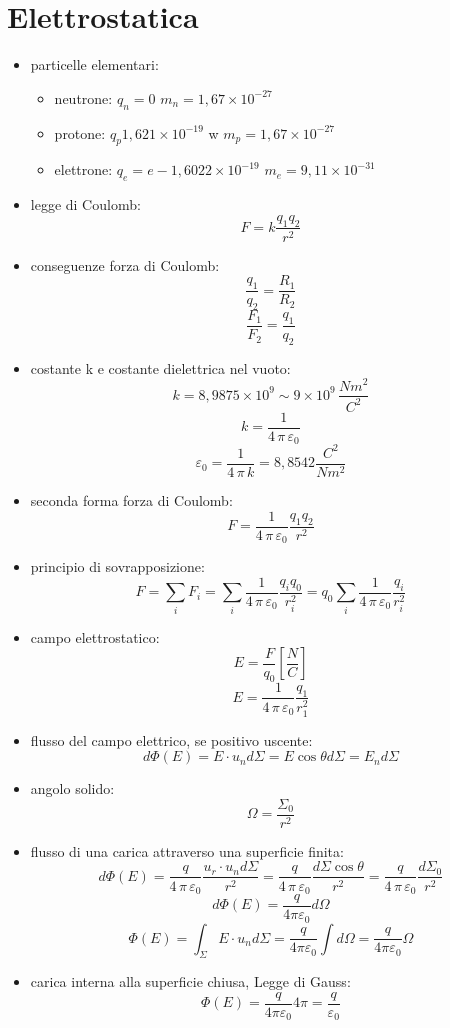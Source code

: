 \documentclass[a4paper,12pt, oneside]{book}
\begin{document}
\section{Elettrostatica}
\begin{itemize}
\item particelle elementari:
\begin{itemize}
\item neutrone: $q_n=0$ $m_n=1,67\times 10^{-27}$
\item protone: $q_p1,621\times 10^{-19}$ w $m_p=1,67\times 10^{-27}$
\item elettrone: $q_e=e-1,6022\times 10^{-19}$ $m_e=9,11\times 10^{-31}$ 
\end{itemize}
\item legge di Coulomb:
$$F=k\frac{q_1q_2}{r^2}$$
\item conseguenze forza di Coulomb:
$$\frac{q_1}{q_2}=\frac{R_1}{R_2}$$
$$\frac{F_1}{F_2}=\frac{q_1}{q_2}$$
\item costante k e costante dielettrica nel vuoto:
$$k=8,9875\times 10^9\sim 9\times 10^9\,\frac{Nm^2}{C^2}$$
$$k=\frac{1}{4\,\pi\,\varepsilon_0}$$
$$\varepsilon_0=\frac{1}{4\,\pi\,k}=8,8542\frac{C^2}{Nm^2}$$
\item seconda forma forza di Coulomb:
$$F=\frac{1}{4\,\pi\,\varepsilon_0}\frac{q_1q_2}{r^2}$$
\item principio di sovrapposizione:
$$F=\sum_i F_i=\sum_i \frac{1}{4\,\pi\,\varepsilon_0}\frac{q_iq_0}{r_i^2}=q_0\sum_i\frac{1}{4\,\pi\,\varepsilon_0}\frac{q_i}{r_i^2}$$
\item campo elettrostatico:
$$E=\frac{F}{q_0}\left[\frac{N}{C}\right]$$
$$E=\frac{1}{4\,\pi\,\varepsilon_0}\frac{q_1}{r_1^2}$$
\item flusso del campo elettrico, se positivo uscente:
$$d\Phi(E)=E\cdot u_nd\Sigma=E\cos \theta d\Sigma=E_nd\Sigma$$
\item angolo solido:
$$\Omega=\frac{\Sigma_0}{r^2}$$
\item flusso di una carica attraverso una superficie finita:
$$d\Phi(E)=\frac{q}{4\,\pi\,\varepsilon_0}\frac{u_r\cdot u_nd\Sigma}{r^2}=\frac{q}{4\,\pi\,\varepsilon_0}\frac{d\Sigma\cos \theta}{r^2}=\frac{q}{4\,\pi\,\varepsilon_0}\frac{d\Sigma_0}{r^2}$$
$$d\Phi(E)=\frac{q}{4\pi\varepsilon_0}d\Omega$$
$$\Phi(E)=\int_\Sigma E\cdot u_nd\Sigma=\frac{q}{4\pi\varepsilon_0}\int d\Omega=\frac{q}{4\pi\varepsilon_0}\Omega$$
\item carica interna alla superficie chiusa, Legge di Gauss:
$$\Phi(E)=\frac{q}{4\pi\varepsilon_0}4\pi=\frac{q}{\varepsilon_0}$$

\end{itemize}
\end{document}
